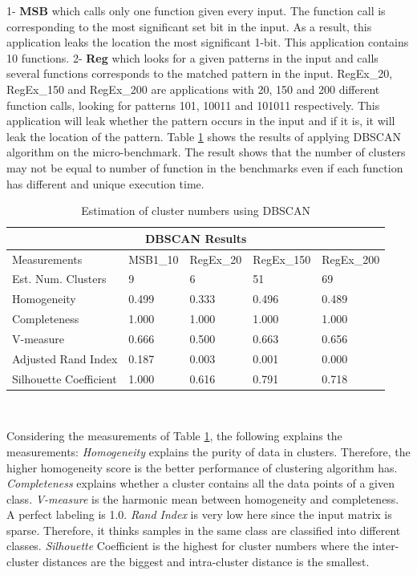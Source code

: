 \documentclass{article}
\begin{document}
1- \textbf{MSB} which calls only one function given every input. The function call is corresponding to the most significant set bit in the input. As a result, this application leaks the location the most significant 1-bit. This application contains 10 functions.
2- \textbf{Reg} which looks for a given patterns in the input and calls several functions corresponds to the matched pattern in the input. RegEx\_20, RegEx\_150 and RegEx\_200 are applications with 20, 150 and 200 different function calls, looking for patterns 101, 10011 and 101011 respectively. This application will leak whether the pattern occurs in the input and if it is, it will leak the location of the pattern. 
Table \ref{tabel5-1} shows the results of applying DBSCAN algorithm on the micro-benchmark.
The result shows that the number of clusters may not be equal to number of function in the benchmarks
even if each function has different and unique execution time.
\begin{table}[t]
  \centering
    \caption{Estimation of cluster numbers using DBSCAN
   }
  \label{tabel5-1}
\begin{tabular}
{ |p{3.5cm}||p{1.6cm}|p{1.6cm}|p{1.6cm}|p{1.6cm}| }
 \hline
 \multicolumn{5}{|c|}{DBSCAN Results} \\
 \hline
 Measurements & MSB1\_10 & RegEx\_20 &RegEx\_150 & RegEx\_200\\
 \hline
 Est. Num. Clusters   & 9 & 6 & 51 & 69\\
 Homogeneity & 0.499 & 0.333 &0.496 & 0.489\\
 Completeness & 1.000 & 1.000 & 1.000 & 1.000\\
 V-measure & 0.666 & 0.500 & 0.663 & 0.656\\
 Adjusted Rand Index & 0.187 & 0.003 & 0.001 & 0.000\\
 Silhouette Coefficient & 1.000 & 0.616 & 0.791 & 0.718\\
 \hline
\end{tabular}\\
\end{table}
Considering the measurements of Table \ref{tabel5-1}, the following explains the measurements: 
\textit{Homogeneity} explains the purity of data in clusters. Therefore, the higher homogeneity score is the better performance of clustering algorithm has. \textit{Completeness} explains whether a cluster contains all the data points of a given class. \textit{V-measure} is the harmonic mean between homogeneity and completeness. A perfect labeling is 1.0. \textit{Rand Index} is very low here since the input matrix is sparse. Therefore, it thinks samples in the same class are classified into different classes.
\textit{Silhouette} Coefficient is the highest for cluster numbers where the inter-cluster distances are the biggest and intra-cluster distance is the smallest.  
\end{document}

